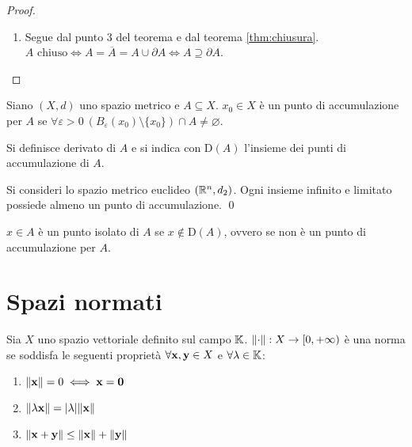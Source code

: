 \begin{proof}
\begin{enumerate}
        \item Segue dal punto 3 del teorema e dal teorema \ref{thm:chiusura}. $A \text{ chiuso} \iff A = \overline{A} = A \cup \partial A \iff A \supseteq \partial A$.
    \end{enumerate}
\end{proof}

\begin{definition}
    Siano $(X, d)$ uno spazio metrico e $A \subseteq X$. $x_0 \in X$ è un punto di accumulazione per $A$ se $\forall \varepsilon > 0 \ (B_\varepsilon(x_0)\setminus \{x_0\})\cap A \neq \varnothing$.
\end{definition}

\begin{definition}
    Si definisce derivato di $A$ e si indica con $\text{D}(A)$ l'insieme dei punti di accumulazione di $A$.
\end{definition}

\begin{theorem}
    Si consideri lo spazio metrico euclideo $(\mathbb{R}^n, d_2)$. Ogni insieme infinito e limitato possiede almeno un punto di accumulazione. \qed
\end{theorem}

\begin{definition}
    $x \in A$ è un punto isolato di $A$ se $x \notin \text{D}(A)$, ovvero se non è un punto di accumulazione per $A$.
\end{definition}

\section{Spazi normati}

\begin{definition}
    [Norma]
    Sia $X$ uno spazio vettoriale definito sul campo $\mathbb{K}$. $\norm{\cdot} : X \to [0, +\infty)$ è una norma se soddisfa le seguenti proprietà $\forall \vb{x},\vb{y} \in X$ e $\forall \lambda \in \mathbb{K}$:
    \begin{enumerate}
        \item $\norm{\vb{x}} = 0 \iff \vb{x} = \vb{0}$
        \item $\norm{\lambda \vb{x}} = \abs{\lambda}\norm{\vb{x}}$
        \item $\norm{\vb{x} + \vb{y}} \leq \norm{\vb{x}} + \norm{\vb{y}}$
    \end{enumerate}
\end{definition}


